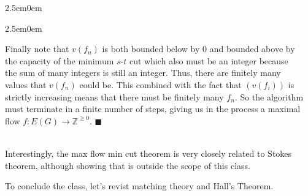 \documentclass{book}
\newenvironment{myIndent}{%
   \begin{adjustwidth}{2.5em}{0em}%
}{%
   \end{adjustwidth}%
}
\newcommand{\mySepTwo}[1][.]{%
   {\noindent\color{#1}{\rule{6.5in}{0.5mm}}}\\%
}
\newcommand{\retTwo}{\hfill\bigbreak}
\begin{document}
{\begin{myIndent}
{\begin{myIndent}
      Finally note that $v(f_n)$ is both bounded below by $0$ and bounded above by\\ the capacity of the minimum $s$-$t$ cut which also must be an integer because\\ the sum of many integers is still an integer. Thus, there are finitely many\\ values that $v(f_n)$ could be. This combined with the fact that $(v(f_i))$ is\\ strictly increasing means that there must be finitely many $f_n$. So the algorithm\\ must terminate in a finite number of steps, giving us in the process a maximal\\ flow $f: E(G) \rightarrow \mathbb{Z}^{\geq 0}$. $\blacksquare$\retTwo
   \end{myIndent}}
\end{myIndent}}

\mySepTwo

Interestingly, the max flow min cut theorem is very closely related to Stokes\\ theorem, although showing that is outside the scope of this class.\retTwo

To conclude the class, let's revist matching theory and Hall's Theorem.\retTwo
\end{document}
